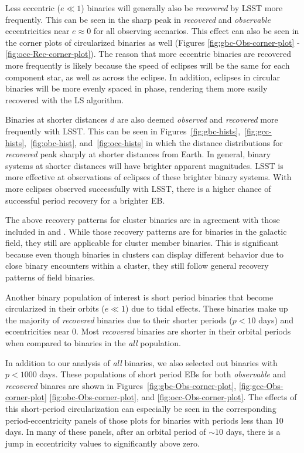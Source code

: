 \documentclass[twocolumn]{aastex63}
\begin{document}
Less eccentric ($e \ll 1$) binaries will generally also be \textit{recovered} by LSST more frequently. This can be seen in the sharp peak in \textit{recovered} and \textit{observable} eccentricities near $e \approx 0$ for all observing scenarios. This effect can also be seen in the corner plots of circularized binaries as well (Figures \ref{fig:gbc-Obs-corner-plot} - \ref{fig:occ-Rec-corner-plot}). The reason that more eccentric binaries are recovered more frequently is likely because the speed of eclipses will be the same for each component star, as well as across the eclipse. In addition, eclipses in circular binaries will be more evenly spaced in phase, rendering them more easily recovered with the LS algorithm.

Binaries at shorter distances $d$  are also deemed \textit{observed} and \textit{recovered} more frequently with LSST. This can be seen in Figures~\ref{fig:gbc-hists},~\ref{fig:gcc-hists},~\ref{fig:obc-hist}, and~\ref{fig:occ-hists} in which the distance distributions for \textit{recovered} peak sharply at shorter distances from Earth. In general, binary systems at shorter distances will have brighter apparent magnitudes. LSST is more effective at observations of eclipses of these brighter binary systems. With more eclipses observed successfully with LSST, there is a higher chance of successful period recovery for a brighter EB. 

The above recovery patterns for cluster binaries are in agreement with those included in \citet{2019AAS...23336317P} and \citet{2011AJ....142...52P}. While those recovery patterns are for binaries in the galactic field, they still are applicable for cluster member binaries. This is significant because even though binaries in clusters can display different behavior due to close binary encounters within a cluster, they still follow general recovery patterns of field binaries. 

Another binary population of interest is short period binaries that become circularized in their orbits ($e \ll 1$) due to tidal effects. These binaries make up the majority of \textit{recovered} binaries due to their shorter periods ($p < 10$ days) and eccentricities near 0. 
Most \textit{recovered} binaries are shorter in their orbital periods when compared to binaries in the \textit{all} population. 

In addition to our analysis of \textit{all} binaries, we also selected out binaries with $\textit{p} < 1000$ days. These populations of short period EBs for both \textit{observable} and \textit{recovered} binares are shown in Figures~\ref{fig:gbc-Obs-corner-plot}, \ref{fig:gcc-Obs-corner-plot} \ref{fig:obc-Obs-corner-plot}, and \ref{fig:occ-Obs-corner-plot}. The effects of this short-period circularization can especially be seen in the corresponding period-eccentricity panels of those plots for binaries with periods less than 10 days. In many of these panels, after an orbital period of $\sim 10$ days, there is a jump in eccentricity values to significantly above zero.
\end{document}
